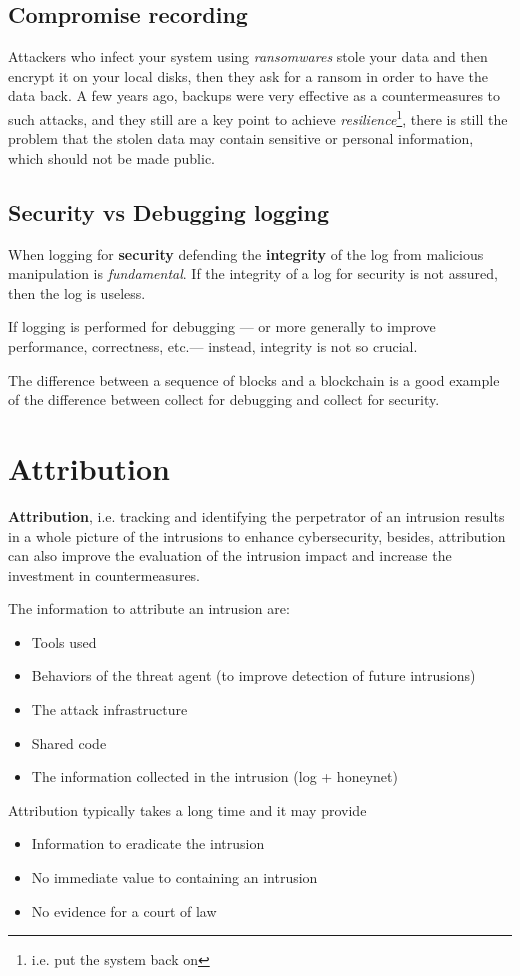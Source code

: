 \subsection{Compromise recording}
Attackers who infect your system using \textit{ransomwares} stole your data and then encrypt it on your local disks,
then they ask for a ransom in order to have the data back.
A few years ago,
backups were very effective as a countermeasures to such attacks,
and they still are a key point to achieve \textit{resilience}\footnote{i.e. put the system back on},
there is still the problem that the stolen data may contain sensitive or personal information,
which should not be made public.

\subsection{Security vs Debugging logging}
When logging for \textbf{security} defending the \textbf{integrity} of the log
from malicious manipulation is \textit{fundamental}.
If the integrity of a log for security is not assured, then the log is useless.

If logging is performed for debugging {---} or more generally to improve performance, correctness, etc.{---} instead,
integrity is not so crucial. 

The difference between a sequence of blocks and a blockchain is a good example of the difference between collect for debugging and collect for security.

\section{Attribution}
\textbf{Attribution}, i.e. tracking and identifying the perpetrator of an intrusion results in a
whole picture of the intrusions to enhance cybersecurity,
besides,
attribution can also improve the evaluation of the intrusion impact and
increase the investment in countermeasures.

The information to attribute an intrusion are:
\begin{itemize}
   \item Tools used
   \item Behaviors of the threat agent (to improve detection of future intrusions)
   \item The attack infrastructure
   \item Shared code
   \item The information collected in the intrusion (log + honeynet)
\end{itemize}
Attribution typically takes a long time and it may provide
\begin{itemize}
   \item Information to eradicate the intrusion
   \item No immediate value to containing an intrusion
   \item No evidence for a court of law
\end{itemize}